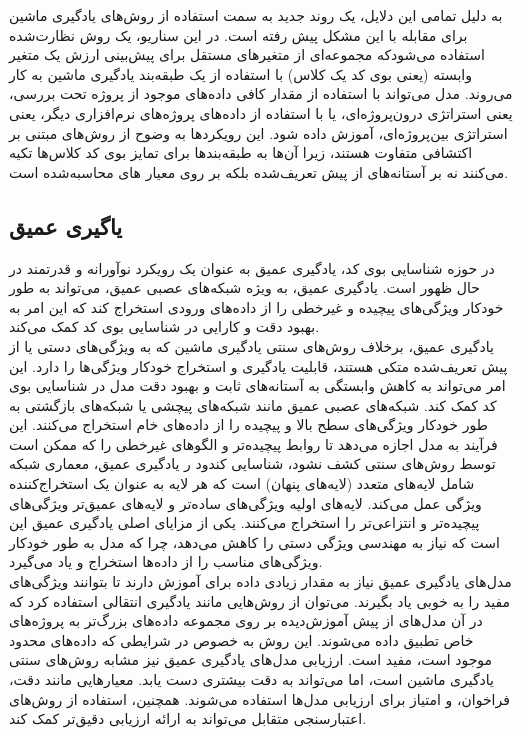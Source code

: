 به دلیل تمامی این دلایل، یک روند جدید به سمت استفاده از روش‌های یادگیری ماشین برای مقابله با این مشکل پیش رفته است. در این سناریو، یک روش نظارت‌شده استفاده می‌شودکه مجموعه‌ای از متغیرهای مستقل برای پیش‌بینی ارزش یک متغیر وابسته (یعنی بوی کد یک کلاس) با استفاده از یک طبقه‌بند یادگیری ماشین به کار می‌روند. مدل می‌تواند با استفاده از مقدار کافی داده‌های موجود از پروژه تحت بررسی، یعنی استراتژی درون‌پروژه‌ای، یا با استفاده از داده‌های پروژه‌های نرم‌افزاری دیگر، یعنی استراتژی بین‌پروژه‌ای، آموزش داده شود. این رویکردها به وضوح از روش‌های مبتنی بر اکتشافی متفاوت هستند، زیرا آن‌ها به طبقه‌بندها برای تمایز بوی کد کلاس‌ها تکیه می‌کنند نه بر آستانه‌های از پیش تعریف‌شده بلکه بر روی معیار های محاسبه‌شده است.\cite{ml}\cite{kaur2017support}

\subsection{یاگیری عمیق}
در حوزه شناسایی بوی کد، یادگیری عمیق به عنوان یک رویکرد نوآورانه و قدرتمند در حال ظهور است. یادگیری عمیق، به ویژه شبکه‌های عصبی عمیق، می‌تواند به طور خودکار ویژگی‌های پیچیده و غیرخطی را از داده‌های ورودی استخراج کند که این امر به بهبود دقت و کارایی در شناسایی بوی کد کمک می‌کند.
\\
یادگیری عمیق، برخلاف روش‌های سنتی یادگیری ماشین که به ویژگی‌های دستی یا از پیش تعریف‌شده متکی هستند، قابلیت یادگیری و استخراج خودکار ویژگی‌ها را دارد. این امر می‌تواند به کاهش وابستگی به آستانه‌های ثابت و بهبود دقت مدل در شناسایی بوی کد کمک کند.
شبکه‌های عصبی عمیق مانند شبکه‌های پیچشی یا شبکه‌های بازگشتی به طور خودکار ویژگی‌های سطح بالا و پیچیده را از داده‌های خام استخراج می‌کنند. این فرآیند به مدل اجازه می‌دهد تا روابط پیچیده‌تر و الگوهای غیرخطی را که ممکن است توسط روش‌های سنتی کشف نشود، شناسایی کندود ر یادگیری عمیق، معماری شبکه شامل لایه‌های متعدد (لایه‌های پنهان) است که هر لایه به عنوان یک استخراج‌کننده ویژگی عمل می‌کند. لایه‌های اولیه ویژگی‌های ساده‌تر و لایه‌های عمیق‌تر ویژگی‌های پیچیده‌تر و انتزاعی‌تر را استخراج می‌کنند. یکی از مزایای اصلی یادگیری عمیق این است که نیاز به مهندسی ویژگی دستی را کاهش می‌دهد، چرا که مدل به طور خودکار ویژگی‌های مناسب را از داده‌ها استخراج و یاد می‌گیرد.
\\
مدل‌های یادگیری عمیق نیاز به مقدار زیادی داده برای آموزش دارند تا بتوانند ویژگی‌های مفید را به خوبی یاد بگیرند. می‌توان از روش‌هایی مانند یادگیری انتقالی استفاده کرد که در آن مدل‌های از پیش آموزش‌دیده بر روی مجموعه داده‌های بزرگ‌تر به پروژه‌های خاص تطبیق داده می‌شوند. این روش به خصوص در شرایطی که داده‌های محدود موجود است، مفید است.
ارزیابی مدل‌های یادگیری عمیق نیز مشابه روش‌های سنتی یادگیری ماشین است، اما می‌تواند به دقت بیشتری دست یابد. معیارهایی مانند دقت، فراخوان، و امتیاز  برای ارزیابی مدل‌ها استفاده می‌شوند. همچنین، استفاده از روش‌های اعتبارسنجی متقابل می‌تواند به ارائه ارزیابی دقیق‌تر کمک کند.\cite{liu2019deep}\cite{das2019detecting}

\clearpage
